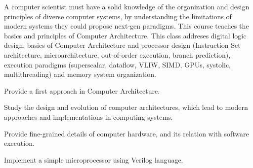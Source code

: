 \begin{syllabus}


\begin{justification}
  A computer scientist must have a solid knowledge of the organization and design principles of diverse computer systems, by understanding the limitations of modern systems they could propose next-gen paradigms.
  This course teaches the basics and principles of Computer Architecture.  This class addreses digital logic design, basics of Computer Architecture and processor design (Instruction Set architecture, microarchitecture, out-of-order execution, branch prediction), execution paradigms (superscalar, dataflow, VLIW, SIMD, GPUs, systolic, multithreading) and memory system organization.
\end{justification}

\begin{goals}
  \item Provide a first approach in Computer Architecture.
  \item Study the design and evolution of computer architectures, which lead to modern approaches and implementations in computing systems. 
  \item Provide fine-grained details of computer hardware, and its relation with software execution.
  \item Implement a simple microprocessor using Verilog language.
\end{goals}




\end{syllabus}

